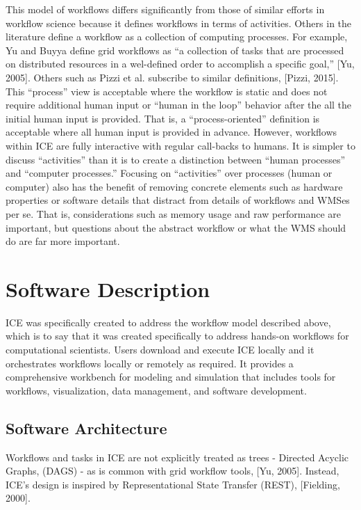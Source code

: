 This model of workflows differs significantly from those of similar
efforts in workflow science because it defines workflows in terms of
activities. Others in the literature define a workflow as a collection
of computing processes. For example, Yu and Buyya define grid workflows
as ``a collection of tasks that are processed on distributed resources
in a wel-defined order to accomplish a specific goal,'' {[}Yu, 2005{]}.
Others such as Pizzi et al. subscribe to similar definitions, {[}Pizzi,
2015{]}. This ``process'' view is acceptable where the workflow is
static and does not require additional human input or ``human in the
loop'' behavior after the all the initial human input is provided. That
is, a ``process-oriented'' definition is acceptable where all human
input is provided in advance. However, workflows within ICE are fully
interactive with regular call-backs to humans. It is simpler to discuss
``activities'' than it is to create a distinction between ``human
processes'' and ``computer processes.'' Focusing on ``activities'' over
processes (human or computer) also has the benefit of removing concrete
elements such as hardware properties or software details that distract
from details of workflows and WMSes per se. That is, considerations such
as memory usage and raw performance are important, but questions about
the abstract workflow or what the WMS should do are far more important.

\section{Software Description}\label{software-description}

ICE was specifically created to address the workflow model described
above, which is to say that it was created specifically to address
hands-on workflows for computational scientists. Users download and
execute ICE locally and it orchestrates workflows locally or remotely as
required. It provides a comprehensive workbench for modeling and
simulation that includes tools for workflows, visualization, data
management, and software development.

\subsection{Software Architecture}\label{software-architecture}

Workflows and tasks in ICE are not explicitly treated as trees -
Directed Acyclic Graphs, (DAGS) - as is common with grid workflow tools,
{[}Yu, 2005{]}. Instead, ICE's design is inspired by Representational
State Transfer (REST), {[}Fielding, 2000{]}.

